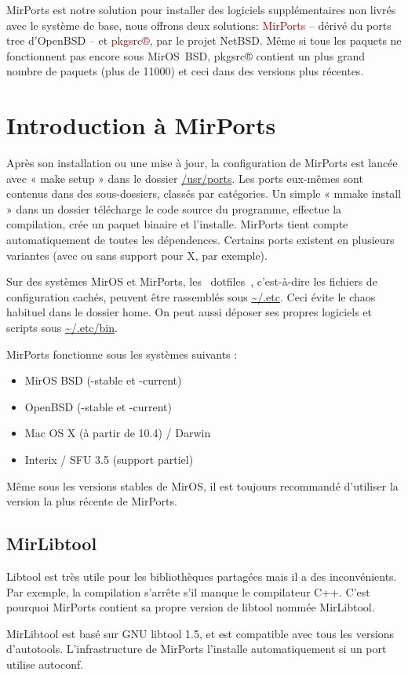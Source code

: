 \documentclass[a4paper,landscape,11pt,notumble]{leaflet}
\begin{document}
\noindent
MirPorts est notre solution pour installer des logiciels supplémentaires non livrés avec le système de base, nous offrons deux solutions: \textcolor{darkred}{MirPorts} -- dérivé du ports tree d’OpenBSD -- et \textcolor{darkred}{pkgsrc®}, par le projet NetBSD.
Même si tous les paquets ne fonctionnent pas encore sous MirOS~BSD, pkgsrc® contient un plus grand nombre de paquets (plus de 11000) et ceci dans des versions plus récentes.

\newpage

\section{Introduction à MirPorts}

Après son installation ou une mise à jour, la configuration de MirPorts est lancée avec « make setup » dans le dossier \url{/usr/ports}.
Les ports eux-mêmes sont contenus dans des sous-dossiers, classés par catégories.
Un simple « mmake install » dans un dossier télécharge le code source du programme, effectue la compilation, crée un paquet binaire et l’installe.
MirPorts tient compte automatiquement de toutes les dépendences.
Certains ports existent en plusieurs variantes (avec ou sans support pour X, par exemple).

Sur des systèmes MirOS et MirPorts, les \flqq~dotfiles~\frqq, c’est-à-dire les fichiers de configuration cachés, peuvent être rassemblés sous \url{~/.etc}. Ceci évite le chaos habituel dans le dossier home. On peut aussi déposer ses propres logiciels et scripts sous \url{~/.etc/bin}.

MirPorts fonctionne sous les systèmes suivants :
%
\begin{itemize}
\item MirOS BSD (-stable et -current)
\item OpenBSD (-stable et -current)
\item Mac OS X (à partir de 10.4) / Darwin
\item Interix / SFU 3.5 (support partiel)
\end{itemize}

\medskip
\noindent
Même sous les versions stables de MirOS, il est toujours recommandé d’utiliser la version la plus récente de MirPorts. 

\subsection{MirLibtool}

\noindent
Libtool est très utile pour les bibliothèques partagées mais il a des inconvénients. Par exemple, la compilation s’arrête s’il manque le compilateur C++. C’est pourquoi MirPorts contient sa propre version de libtool nommée MirLibtool.

MirLibtool est basé sur GNU libtool 1.5, et est compatible avec tous les versions d’autotools. L’infrastructure de MirPorts l’installe automatiquement  si un port utilise autoconf.
\end{document}
